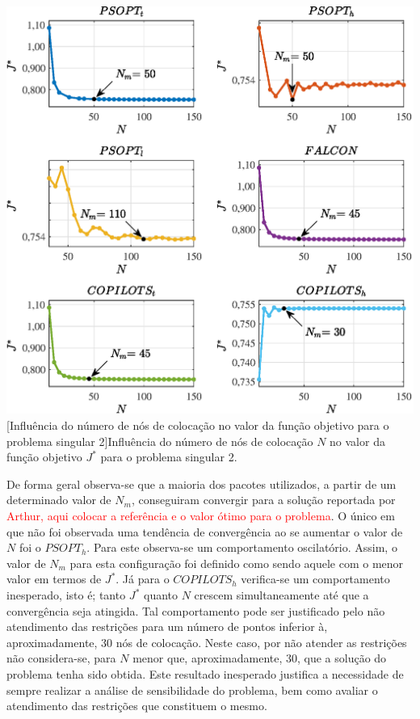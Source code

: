 \noindent	
\begin{minipage}{\textwidth}
	\vspace{\onelineskip}
	\centering
	\includegraphics[scale=0.70]{fig/resultados/singular2/sens/J}
	[Influência do número de nós de colocação no valor da função objetivo para o problema singular 2]{Influência do número de nós de colocação $ N $ no valor da função objetivo $ J^* $ para o problema singular 2.}
	\label{fig:singular2:sensibilidade:J}
	\vspace{\onelineskip}
\end{minipage}


De forma geral observa-se que a maioria dos pacotes utilizados, a partir de um determinado valor de $ N_m $, conseguiram convergir para a solução reportada por \textcolor{red}{Arthur, aqui colocar a referência e o valor ótimo para o problema}. O único em que não foi observada uma tendência de convergência ao se aumentar o valor de $N$ foi o $ PSOPT_h$. Para este observa-se um comportamento oscilatório. Assim, o valor de $ N_m $ para esta configuração foi definido como sendo aquele com o menor valor em termos de $ J^* $. Já para o $ COPILOTS_h $ verifica-se um comportamento inesperado, isto é; tanto $ J^* $ quanto $ N $ crescem simultaneamente até que a convergência seja atingida. Tal comportamento pode ser justificado pelo não atendimento das restrições para um número de pontos inferior à, aproximadamente, 30 nós de colocação. Neste caso, por não atender as restrições não considera-se, para $N$ menor que, aproximadamente, 30, que a solução do problema tenha sido obtida. Este resultado inesperado justifica a necessidade de sempre realizar a análise de sensibilidade do problema, bem como avaliar o atendimento das restrições que constituem o mesmo.

